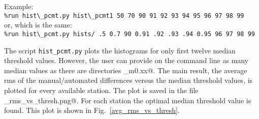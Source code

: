 \documentclass[preprint]{aastex}
\begin{document}
Example: \\
\verb$%run hist\_pcmt.py hist\_pcmt1 50 70 90 91 92 93 94 95 96 97 98 99$ \\
or, which is the same: \\
\verb$%run hist\_pcmt.py hists/ .5 0.7 90 0.91 .92 .93 .94 0.95 96 97 98 99$

The script \texttt{hist\_pcmt.py} plots the histograms for only first twelve median threshold values. However, the user can provide on the command line as many median values as there are directories \verb@pcmt_m0.xx@. The main result, the average rms of the manual/automated differences versus the median threshold values, is plotted for every available station. The plot is saved in the file \verb@avg_rms_vs_thresh.png@. 
For each station the optimal median threshold value is found. This plot is shown in Fig.~\ref{avg_rms_vs_thresh}.

\begin{figure*}   [ht!]
\caption{\small Results of the search for the best median thresholds for every station.
\label{avg_rms_vs_thresh}}
\end{figure*}
\end{document}
